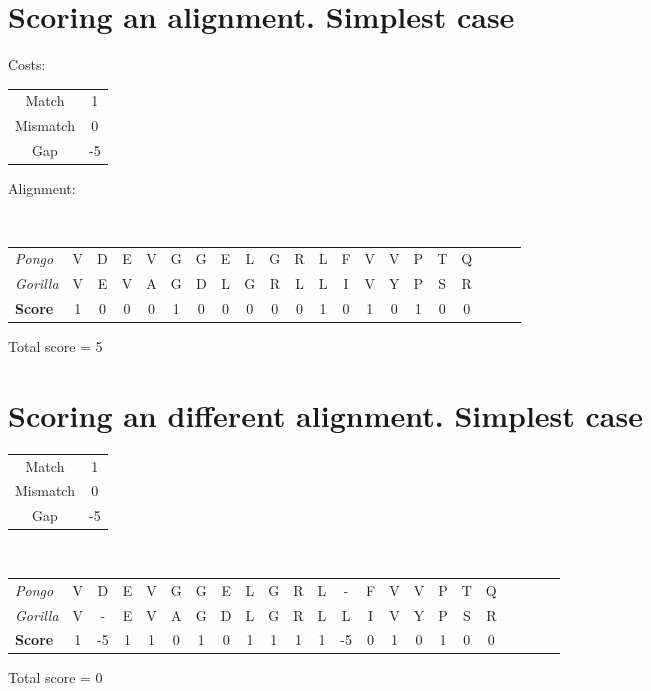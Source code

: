 \documentclass[landscape]{foils}
\begin{document}
\myNewSlide
\section*{Scoring an alignment. Simplest case}
Costs:
\begin{center}
\begin{tabular}{cc}
Match & 1 \\
Mismatch & 0 \\
Gap & -5 \\
\end{tabular}
\end{center}

Alignment:\\
{\tt
\small
\begin{tabular}{lcccccccccccccccccccc}
{\em Pongo}   &V&D&E&V&G&G&E&L&G&R&L&F&V&V&P&T&Q\\ 
{\em Gorilla} &V&E&V&A&G&D&L&G&R&L&L&I&V&Y&P&S&R\\
\hline
{\bf Score}   &1&0&0&0&1&0&0&0&0&0&1&0&1&0&1&0&0\\
\end{tabular}
}

Total score = 5


\myNewSlide
\section*{Scoring an different alignment. Simplest case}
\begin{center}
\begin{tabular}{cc}
Match & 1 \\
Mismatch & 0 \\
Gap & -5 \\
\end{tabular}
\end{center}
{\tt
\small
\begin{tabular}{lcccccccccccccccccccccc}
{\em Pongo}   &V&D &E&V&G&G&E&L&G&R&L&- &F&V&V&P&T&Q\\ 
{\em Gorilla} &V&- &E&V&A&G&D&L&G&R&L&L &I&V&Y&P&S&R\\
\hline
{\bf Score}   &1&-5&1&1&0&1&0&1&1&1&1&-5&0&1&0&1&0&0\\
\end{tabular}
}

Total score = 0

\myNewSlide
\end{document}
